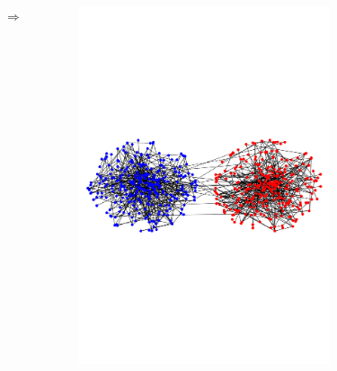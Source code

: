 \documentclass[notheorems]{beamer}
\begin{document}
\begin{frame}
\begin{columns}
\begin{figure}
	\end{figure}
	$\Rightarrow$
	\begin{figure}
	\includegraphics[width=\textwidth]{bennot.pdf}
	\end{figure}
\end{columns}


\end{frame}
\end{document}
